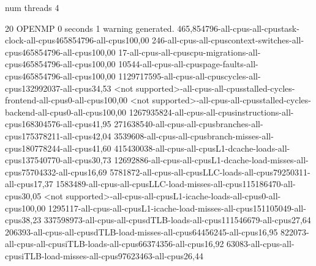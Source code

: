 num threads 4

20
OPENMP
0 seconds
1 warning generated.
465,854796-all-cpus-all-cpustask-clock-all-cpus465854796-all-cpus100,00
246-all-cpus-all-cpuscontext-switches-all-cpus465854796-all-cpus100,00
17-all-cpus-all-cpuscpu-migrations-all-cpus465854796-all-cpus100,00
10544-all-cpus-all-cpuspage-faults-all-cpus465854796-all-cpus100,00
1129717595-all-cpus-all-cpuscycles-all-cpus132992037-all-cpus34,53
<not supported>-all-cpus-all-cpusstalled-cycles-frontend-all-cpus0-all-cpus100,00
<not supported>-all-cpus-all-cpusstalled-cycles-backend-all-cpus0-all-cpus100,00
1267935824-all-cpus-all-cpusinstructions-all-cpus168304576-all-cpus41,95
271638540-all-cpus-all-cpusbranches-all-cpus175378211-all-cpus42,04
3539608-all-cpus-all-cpusbranch-misses-all-cpus180778244-all-cpus41,60
415430038-all-cpus-all-cpusL1-dcache-loads-all-cpus137540770-all-cpus30,73
12692886-all-cpus-all-cpusL1-dcache-load-misses-all-cpus75704332-all-cpus16,69
5781872-all-cpus-all-cpusLLC-loads-all-cpus79250311-all-cpus17,37
1583489-all-cpus-all-cpusLLC-load-misses-all-cpus115186470-all-cpus30,05
<not supported>-all-cpus-all-cpusL1-icache-loads-all-cpus0-all-cpus100,00
1295117-all-cpus-all-cpusL1-icache-load-misses-all-cpus151105049-all-cpus38,23
337598973-all-cpus-all-cpusdTLB-loads-all-cpus111546679-all-cpus27,64
206393-all-cpus-all-cpusdTLB-load-misses-all-cpus64456245-all-cpus16,95
822073-all-cpus-all-cpusiTLB-loads-all-cpus66374356-all-cpus16,92
63083-all-cpus-all-cpusiTLB-load-misses-all-cpus97623463-all-cpus26,44
